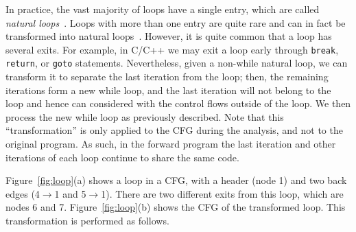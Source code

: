 \documentclass[12pt]{gatech-thesis}
\begin{document}
In practice, the vast majority of loops have a single entry, which are called \emph{natural loops}~\cite{Muchnick}. 
Loops with more than one entry are quite rare and can in fact be transformed into natural loops~\cite{Muchnick}. 
However, it is quite common that a loop has several exits. 
For example, in C/C++ we may exit a loop early through \texttt{break}, \texttt{return}, or \texttt{goto} statements.
Nevertheless, given a non-while natural loop, we can transform it to separate the last iteration from the loop;
then, the remaining iterations form a new while loop, and the last iteration will not belong to the loop and hence can considered with the control flows outside of the loop. 
We then process the new while loop as previously described.
Note that this ``transformation'' is only applied to the CFG during the analysis, and not to the original program.
As such, in the forward program \Forward the last iteration and other iterations of each loop continue to share the same code.


Figure~\ref{fig:loop}(a) shows a loop in a CFG, with a header (node 1) and two back edges (4$\to$1 and 5$\to$1). 
There are two different exits from this loop, which are nodes 6 and 7.
Figure~\ref{fig:loop}(b) shows the CFG of the transformed loop.
This transformation is performed as follows.
\end{document}
